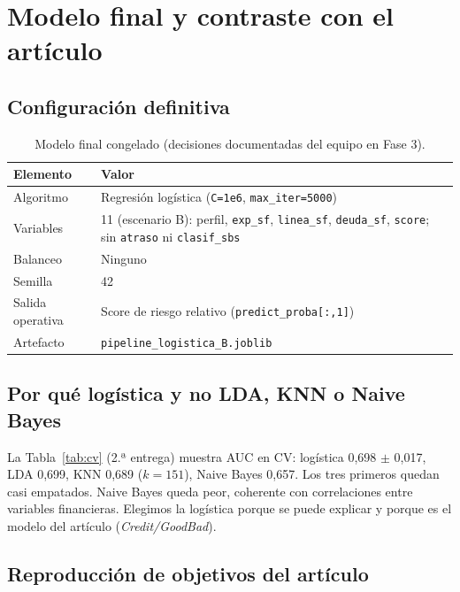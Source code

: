 \documentclass[11pt]{article}
\begin{document}
\section{Modelo final y contraste con el artículo}

\subsection{Configuración definitiva}

\begin{table}[H]
\centering
\caption{Modelo final congelado (decisiones documentadas del equipo en Fase 3).}
\label{tab:config}
\small
\begin{tabular}{@{}ll@{}}
\toprule
\textbf{Elemento} & \textbf{Valor} \\
\midrule
Algoritmo & Regresión logística (\texttt{C=1e6}, \texttt{max\_iter=5000}) \\
Variables & 11 (escenario B): perfil, \texttt{exp\_sf}, \texttt{linea\_sf}, \texttt{deuda\_sf}, \texttt{score}; sin \texttt{atraso} ni \texttt{clasif\_sbs} \\
Balanceo & Ninguno \\
Semilla & 42 \\
Salida operativa & Score de riesgo relativo (\texttt{predict\_proba[:,1]}) \\
Artefacto & \texttt{pipeline\_logistica\_B.joblib} \\
\bottomrule
\end{tabular}
\end{table}

\subsection{Por qué logística y no LDA, KNN o Naive Bayes}

La Tabla~\ref{tab:cv} (2.ª entrega) muestra AUC en CV: logística 0,698 $\pm$ 0,017, LDA 0,699, KNN 0,689 ($k=151$), Naive Bayes 0,657. Los tres primeros quedan casi empatados. Naive Bayes queda peor, coherente con correlaciones entre variables financieras. Elegimos la logística porque se puede explicar y porque es el modelo del artículo (\textit{Credit/GoodBad}).

\subsection{Reproducción de objetivos del artículo}
\end{document}
